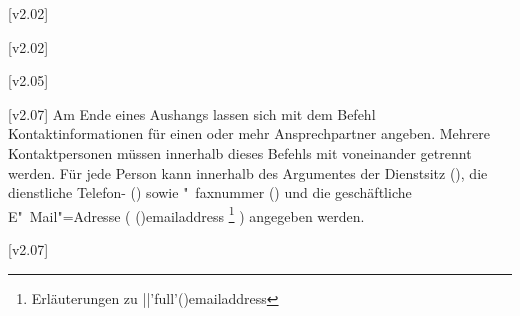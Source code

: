 \begin{DeclareEntity}{}
\begin{Declaration}
  {}
  [v2.02]
\begin{Declaration*}
  {}
\begin{Declaration*}
  {}
\begin{Declaration}
  {}
  [v2.02]
\begin{Declaration}
  {}
  [v2.05]
\begin{Declaration}
  {}
\printdeclarationlist
%
[v2.07]
Am Ende eines Aushangs lassen sich mit dem Befehl  
Kontaktinformationen für einen oder mehr Ansprechpartner angeben. Mehrere 
Kontaktpersonen müssen innerhalb dieses Befehls mit  voneinander 
getrennt werden. Für jede Person kann innerhalb des Argumentes der Dienstsitz 
(), die dienstliche Telefon- () sowie "~faxnummer
() und die geschäftliche E"~Mail"=Adresse (%
  \Macro(){emailaddress}%
  \footnote{Erläuterungen zu \Macro||'full'(){emailaddress}}%
) angegeben werden. 
\end{Declaration}
\end{Declaration}
\end{Declaration}
\end{Declaration*}
\end{Declaration*}
\end{Declaration}

[v2.07]




\end{DeclareEntity}
